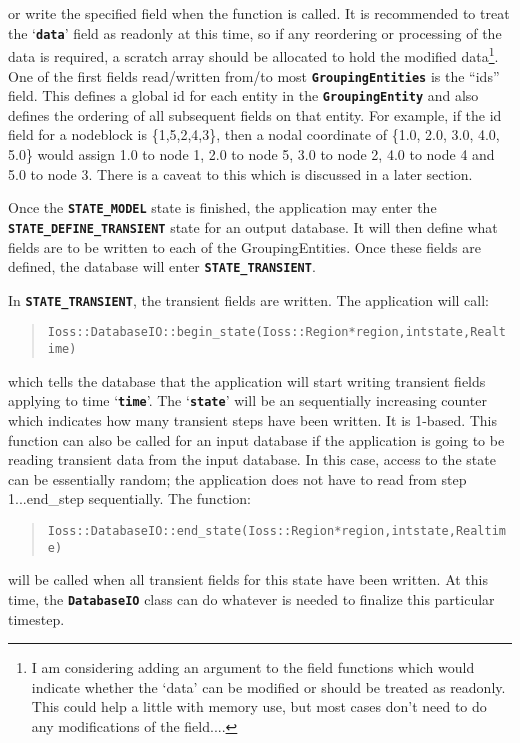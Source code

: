 \documentclass[11pt,twoside]{article}
\newcommand{\code}[1]
   {\mbox{\bf\tt #1}\null}
\newenvironment{source}
{\small\begin{quote}\begin{alltt}}
{\end{alltt}\end{quote}\normalsize}
\begin{document}
or write the specified field when the function is called. It is
recommended to treat the `\code{data}' field as readonly at
this time, so if any reordering or processing of the data is required,
a scratch array should be allocated to hold the modified
data\footnote{I am considering adding an argument to the field
functions which would indicate whether the `data' can be modified or
should be treated as readonly. This could help a little with memory
use, but most cases don't need to do any modifications of the
field....}. One of the first fields read/written from/to most
\code{GroupingEntities} is the ``ids'' field. This defines a
global id for each entity in the \code{GroupingEntity} and
also defines the ordering of all subsequent fields on that entity. For
example, if the id field for a nodeblock is \{1,5,2,4,3\}, then a nodal
coordinate of \{1.0, 2.0, 3.0, 4.0, 5.0\} would assign 1.0 to node 1,
2.0 to node 5, 3.0 to node 2, 4.0 to node 4 and 5.0 to node 3. There is
a caveat to this which is discussed in a later section.

Once the \code{STATE\_MODEL} state is finished, the
application may enter the \code{STATE\_DEFINE\_TRANSIENT}
state for an output database. It will then define what fields are to be
written to each of the GroupingEntities. Once these fields are defined,
the database will enter \code{STATE\_TRANSIENT}.

In \code{STATE\_TRANSIENT}, the transient fields are written.
The application will call:
\begin{source}
Ioss::DatabaseIO::begin\_state(Ioss::Region *region, int state, Real time)
\end{source}
which tells the database that the application will start writing
transient fields applying to time `\code{time}'. The
`\code{state}' will be an sequentially increasing counter
which indicates how many transient steps have been written. It is
1{}-based. This function can also be called for an input database if
the application is going to be reading transient data from the input
database. In this case, access to the state can be essentially random;
the application does not have to read from step 1...end\_step
sequentially. The function:
\begin{source}
Ioss::DatabaseIO::end\_state(Ioss::Region *region, int state, Real time)
\end{source}
will be called when all transient fields for this state have been
written. At this time, the \code{DatabaseIO} class can do
whatever is needed to finalize this particular timestep.
\end{document}
